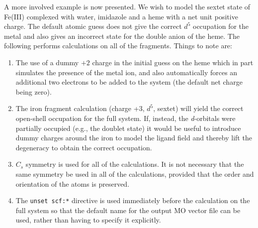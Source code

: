 A more involved example is now presented.  We wish to model the sextet
state of Fe(III) complexed with water, imidazole and a heme with a net
unit positive charge.  The default atomic guess does not give the
correct $d^5$ occupation for the metal and also gives an incorrect
state for the double anion of the heme.  The following performs
calculations on all of the fragments.  Things to note are:
\begin{enumerate}
\item The use
of a dummy $+2$ charge in the initial guess on the heme which in part
simulates the presence of the metal ion, and also automatically forces
an additional two electrons to be added to the system (the default net
charge being zero).
\item The iron fragment calculation (charge +3, $d^5$, sextet) will
  yield the correct open-shell occupation for the full system.  If,
  instead, the {\it d}-orbitals were partially occupied (e.g., the doublet
  state) it would be useful to introduce dummy charges around the iron
  to model the ligand field and thereby lift the degeneracy to obtain
  the correct occupation.
\item $C_s$ symmetry is used for all of the calculations.  It is not
  necessary that the same symmetry be used in  all of the
  calculations, provided that the order and orientation of the atoms 
  is preserved.
\item The \verb+unset scf:*+ directive is used immediately before
  the calculation on the full system so that the default name for the
  output MO vector file can be used, rather than having to specify it
  explicitly.
\end{enumerate}

